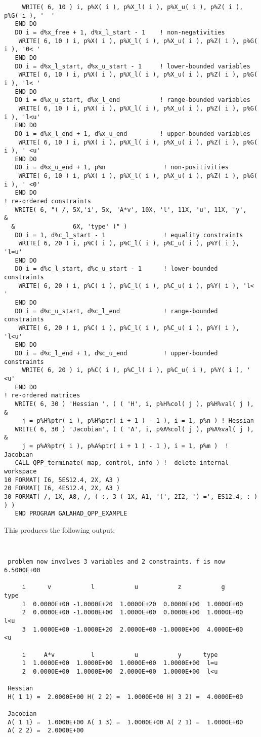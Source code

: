 \documentclass{galahad}
\begin{document}
{\begin{verbatim}
     WRITE( 6, 10 ) i, p%X( i ), p%X_l( i ), p%X_u( i ), p%Z( i ), p%G( i ), '  '
   END DO
   DO i = d%x_free + 1, d%x_l_start - 1    ! non-negativities
    WRITE( 6, 10 ) i, p%X( i ), p%X_l( i ), p%X_u( i ), p%Z( i ), p%G( i ), '0< '
   END DO
   DO i = d%x_l_start, d%x_u_start - 1     ! lower-bounded variables
    WRITE( 6, 10 ) i, p%X( i ), p%X_l( i ), p%X_u( i ), p%Z( i ), p%G( i ), 'l< '
   END DO
   DO i = d%x_u_start, d%x_l_end           ! range-bounded variables
    WRITE( 6, 10 ) i, p%X( i ), p%X_l( i ), p%X_u( i ), p%Z( i ), p%G( i ), 'l<u'
   END DO
   DO i = d%x_l_end + 1, d%x_u_end         ! upper-bounded variables
    WRITE( 6, 10 ) i, p%X( i ), p%X_l( i ), p%X_u( i ), p%Z( i ), p%G( i ), ' <u'
   END DO
   DO i = d%x_u_end + 1, p%n                ! non-positivities
    WRITE( 6, 10 ) i, p%X( i ), p%X_l( i ), p%X_u( i ), p%Z( i ), p%G( i ), ' <0'
   END DO
! re-ordered constraints
   WRITE( 6, "( /, 5X,'i', 5x, 'A*v', 10X, 'l', 11X, 'u', 11X, 'y',            &
  &                6X, 'type' )" )
   DO i = 1, d%c_l_start - 1                ! equality constraints
    WRITE( 6, 20 ) i, p%C( i ), p%C_l( i ), p%C_u( i ), p%Y( i ), 'l=u'
   END DO
   DO i = d%c_l_start, d%c_u_start - 1      ! lower-bounded constraints
    WRITE( 6, 20 ) i, p%C( i ), p%C_l( i ), p%C_u( i ), p%Y( i ), 'l< '
   END DO
   DO i = d%c_u_start, d%c_l_end            ! range-bounded constraints
    WRITE( 6, 20 ) i, p%C( i ), p%C_l( i ), p%C_u( i ), p%Y( i ), 'l<u'
   END DO
   DO i = d%c_l_end + 1, d%c_u_end          ! upper-bounded constraints
     WRITE( 6, 20 ) i, p%C( i ), p%C_l( i ), p%C_u( i ), p%Y( i ), ' <u'
   END DO
! re-ordered matrices
   WRITE( 6, 30 ) 'Hessian ', ( ( 'H', i, p%H%col( j ), p%H%val( j ),          &
     j = p%H%ptr( i ), p%H%ptr( i + 1 ) - 1 ), i = 1, p%n ) ! Hessian
   WRITE( 6, 30 ) 'Jacobian', ( ( 'A', i, p%A%col( j ), p%A%val( j ),          &
     j = p%A%ptr( i ), p%A%ptr( i + 1 ) - 1 ), i = 1, p%m )  ! Jacobian
   CALL QPP_terminate( map, control, info ) !  delete internal workspace
10 FORMAT( I6, 5ES12.4, 2X, A3 )
20 FORMAT( I6, 4ES12.4, 2X, A3 )
30 FORMAT( /, 1X, A8, /, ( :, 3 ( 1X, A1, '(', 2I2, ') =', ES12.4, : ) ) )
   END PROGRAM GALAHAD_QPP_EXAMPLE
\end{verbatim}
}
\noindent
This produces the following output:
{\tt \small
\begin{verbatim}
 problem now involves 3 variables and 2 constraints. f is now 6.5000E+00

     i      v           l           u           z           g      type
     1  0.0000E+00 -1.0000E+20  1.0000E+20  0.0000E+00  1.0000E+00
     2  0.0000E+00 -1.0000E+00  1.0000E+00  0.0000E+00  1.0000E+00  l<u
     3  1.0000E+00 -1.0000E+20  2.0000E+00 -1.0000E+00  4.0000E+00   <u

     i     A*v          l           u           y      type
     1  1.0000E+00  1.0000E+00  1.0000E+00  1.0000E+00  l=u
     2  0.0000E+00  1.0000E+00  2.0000E+00  1.0000E+00  l<u

 Hessian
 H( 1 1) =  2.0000E+00 H( 2 2) =  1.0000E+00 H( 3 2) =  4.0000E+00

 Jacobian
 A( 1 1) =  1.0000E+00 A( 1 3) =  1.0000E+00 A( 2 1) =  1.0000E+00
 A( 2 2) =  2.0000E+00
\end{verbatim}
}
\end{document}
